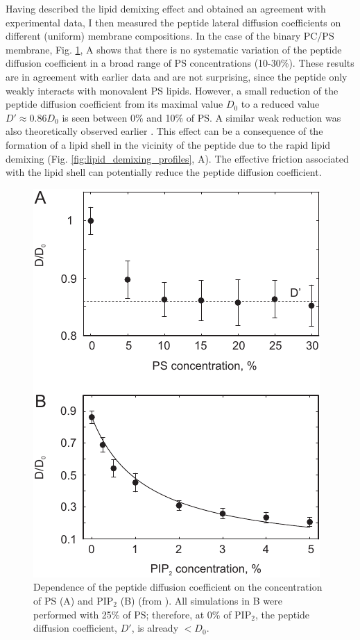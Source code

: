 Having described the lipid demixing effect and obtained an agreement with experimental data, I then measured the peptide lateral diffusion coefficients on different (uniform) membrane compositions. In the case of the binary PC/PS membrane, Fig. \ref{fig:peptide_diffusion}, A shows that there is no systematic variation of the peptide diffusion coefficient in a broad range of PS concentrations (10-30\%). These results are in agreement with earlier data \cite{Golebiewska2006} and are not surprising, since the peptide only weakly interacts with monovalent PS lipids. However, a small reduction of the peptide diffusion coefficient from its maximal value $D_0$ to a reduced value $D'\approx0.86D_0$ is seen between 0\% and 10\% of PS. A similar weak reduction was also theoretically observed earlier \cite{Khelashvili2008}. This effect can be a consequence of the formation of a lipid shell in the vicinity of the peptide due to the rapid lipid demixing (Fig. \ref{fig:lipid_demixing_profiles}, A). The effective friction associated with the lipid shell can potentially reduce the peptide diffusion coefficient.
\begin{figure}[!ht]
\begin{center}
  \includegraphics[scale=1.15]{../figures/peptide_diffusion.pdf}
\end{center}
 \caption[Dependence of the peptide diffusion coefficient on the membrane composition]{Dependence of the peptide diffusion coefficient on the concentration of PS (A) and PIP$_2$ (B) (from \cite{Kiselev2011}). All simulations in B were performed with 25\% of PS; therefore, at 0\% of PIP$_2$, the peptide diffusion coefficient, $D'$, is already $<D_0$.}
\label{fig:peptide_diffusion}
\end{figure}

